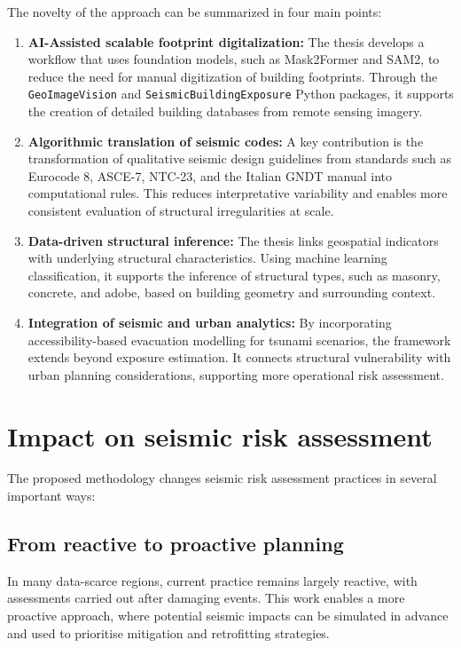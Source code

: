 The novelty of the approach can be summarized in four main points:
\begin{enumerate}
    \item \textbf{AI-Assisted scalable footprint digitalization:} The thesis develops a workflow that uses foundation models, such as Mask2Former and SAM2, to reduce the need for manual digitization of building footprints. Through the \texttt{GeoImageVision} and \texttt{SeismicBuildingExposure} Python packages, it supports the creation of detailed building databases from remote sensing imagery.
    
    \item \textbf{Algorithmic translation of seismic codes:} A key contribution is the transformation of qualitative seismic design guidelines from standards such as Eurocode 8, ASCE-7, NTC-23, and the Italian GNDT manual into computational rules. This reduces interpretative variability and enables more consistent evaluation of structural irregularities at scale.
    
    \item \textbf{Data-driven structural inference:} The thesis links geospatial indicators with underlying structural characteristics. Using machine learning classification, it supports the inference of structural types, such as masonry, concrete, and adobe, based on building geometry and surrounding context.
    
    \item \textbf{Integration of seismic and urban analytics:} By incorporating accessibility-based evacuation modelling for tsunami scenarios, the framework extends beyond exposure estimation. It connects structural vulnerability with urban planning considerations, supporting more operational risk assessment.
\end{enumerate}

\renewcommand{\sectionnametext}{Impact on seismic risk assessment}
\renewcommand{\headingtextR}{\thesection. \sectionnametext}
\section{\sectionnametext}

The proposed methodology changes seismic risk assessment practices in several important ways:

\subsection*{From reactive to proactive planning}
In many data-scarce regions, current practice remains largely reactive, with assessments carried out after damaging events. This work enables a more proactive approach, where potential seismic impacts can be simulated in advance and used to prioritise mitigation and retrofitting strategies.

